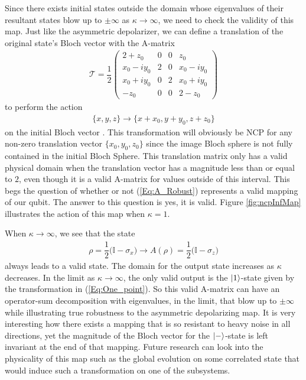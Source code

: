 \documentclass[12pt]{iopart}
\begin{document}
Since there exists initial states outside the domain whose eigenvalues of their resultant states blow up to $\pm \infty$ as $\kappa \rightarrow \infty$, we need to check the validity of this map. %
Just like the asymmetric depolarizer, we can define a translation of the original state's Bloch vector with the A-matrix
\begin{align}\label{eq:genTranslation}
    \mathcal{T} = \dfrac{1}{2} 
    \left(
    \begin{array}{cccc}
        2+z_0 & 0 & 0 & z_0 \\
        x_0 - i y_0 & 2 & 0 & x_0 - i y_0 \\
        x_0 + i y_0 & 0 & 2 & x_0 + i y_0 \\
        -z_0 & 0 & 0 & 2-z_0
    \end{array}
    \right)
\end{align}
to perform the action
\begin{align}
    \{ x, y, z \} \longrightarrow \{ x+x_0, y+y_0, z+z_0 \}
\end{align}
on the initial Bloch vector \cite{Jagadish_2019_General_Case}. This transformation will obviously be NCP for any non-zero translation vector $\{ x_0, y_0, z_0 \}$ since the image Bloch sphere is not fully contained in the initial Bloch Sphere. This translation matrix only has a valid physical domain when the translation vector has a magnitude less than or equal to $2$, even though it is a valid A-matrix for values outside of this interval. This begs the question of whether or not (\ref{Eq:A_Robust}) represents a valid mapping of our qubit. The answer to this question is yes, it is valid. Figure \ref{fig:ncpInfMap} illustrates the action of this map when $\kappa=1$. 

When $\kappa \rightarrow \infty$, we see that the state
\begin{align}
\label{Eq:One_point}
    \rho = \dfrac{1}{2} \big( \mathbb{I} - \sigma_x \big) \longrightarrow A(\rho) = \dfrac{1}{2} \big( \mathbb{I} - \sigma_z \big) 
\end{align}
always leads to a valid state.
The domain for the output state increases as $\kappa$ decreases. In the limit as $\kappa\rightarrow\infty$, the only valid output is the $\ket{1}$-state given by the transformation in (\ref{Eq:One_point}). So this valid A-matrix can have an operator-sum decomposition with eigenvalues, in the limit, that blow up to $\pm \infty$ while illustrating true robustness to the asymmetric depolarizing map. It is very interesting how there exists a mapping that is so resistant to heavy noise in all directions, yet the magnitude of the Bloch vector for the $\ket{-}$-state is left invariant at the end of that mapping. Future research can look into the physicality of this map such as the global evolution on some correlated state that would induce such a transformation on one of the subsystems.
\end{document}
